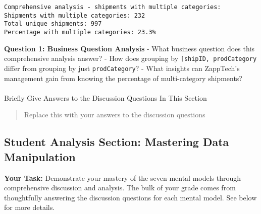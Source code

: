 \documentclass[
  letterpaper,
  DIV=11,
  numbers=noendperiod]{scrartcl}
\makeatletter
\let\oldparagraph\paragraph
\renewcommand{\paragraph}{
    \@ifstar
      \xxxParagraphStar
      \xxxParagraphNoStar
  }
\newcommand{\xxxParagraphStar}[1]{\oldparagraph*{#1}\mbox{}}
\newcommand{\xxxParagraphNoStar}[1]{\oldparagraph{#1}\mbox{}}
\makeatother
\begin{document}
\begin{verbatim}
Comprehensive analysis - shipments with multiple categories:
Shipments with multiple categories: 232
Total unique shipments: 997
Percentage with multiple categories: 23.3%
\end{verbatim}

\begin{tcolorbox}[enhanced jigsaw, colbacktitle=quarto-callout-important-color!10!white, opacitybacktitle=0.6, colframe=quarto-callout-important-color-frame, coltitle=black, left=2mm, titlerule=0mm, title=\textcolor{quarto-callout-important-color}{\faExclamation}\hspace{0.5em}{🤔 Discussion Questions: Answering A Business Question}, bottomtitle=1mm, opacityback=0, arc=.35mm, rightrule=.15mm, colback=white, breakable, bottomrule=.15mm, toprule=.15mm, toptitle=1mm, leftrule=.75mm]

\textbf{Question 1: Business Question Analysis} - What business question
does this comprehensive analysis answer? - How does grouping by
\texttt{{[}\textquotesingle{}shipID\textquotesingle{},\ \textquotesingle{}prodCategory\textquotesingle{}{]}}
differ from grouping by just
\texttt{\textquotesingle{}prodCategory\textquotesingle{}}? - What
insights can ZappTech's management gain from knowing the percentage of
multi-category shipments?

\end{tcolorbox}

\paragraph{Briefly Give Answers to the Discussion Questions In This
Section}\label{briefly-give-answers-to-the-discussion-questions-in-this-section-7}

\begin{quote}
Replace this with your answers to the discussion questions
\end{quote}

\subsection{Student Analysis Section: Mastering Data
Manipulation}\label{student-analysis-section}

\textbf{Your Task:} Demonstrate your mastery of the seven mental models
through comprehensive discussion and analysis. The bulk of your grade
comes from thoughtfully answering the discussion questions for each
mental model. See below for more details.
\end{document}

